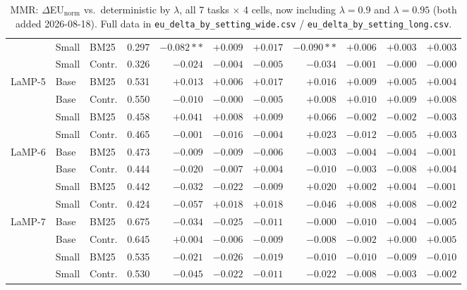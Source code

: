 \documentclass[10pt]{article}
\begin{document}
\begin{table}[p]
\begin{tabular}{@{}lllrrrrrrrr@{}}
\cmidrule(lr){2-11}
 & Small & BM25 & 0.297 & $-0.082**$ & $+0.009$ & $+0.017$ & $-0.090**$ & $+0.006$ & $+0.003$ & $+0.003$ \\
\cmidrule(lr){2-11}
 & Small & Contr. & 0.326 & $-0.024$ & $-0.004$ & $-0.005$ & $-0.034$ & $-0.001$ & $-0.000$ & $-0.000$ \\
\midrule
\multirow{4}{*}{LaMP-5} & Base & BM25 & 0.531 & $+0.013$ & $+0.006$ & $+0.017$ & $+0.016$ & $+0.009$ & $+0.005$ & $+0.004$ \\
\cmidrule(lr){2-11}
 & Base & Contr. & 0.550 & $-0.010$ & $-0.000$ & $-0.005$ & $+0.008$ & $+0.010$ & $+0.009$ & $+0.008$ \\
\cmidrule(lr){2-11}
 & Small & BM25 & 0.458 & $+0.041$ & $+0.008$ & $+0.009$ & $+0.066$ & $-0.002$ & $-0.002$ & $-0.003$ \\
\cmidrule(lr){2-11}
 & Small & Contr. & 0.465 & $-0.001$ & $-0.016$ & $-0.004$ & $+0.023$ & $-0.012$ & $-0.005$ & $+0.003$ \\
\midrule
\multirow{4}{*}{LaMP-6} & Base & BM25 & 0.473 & $-0.009$ & $-0.009$ & $-0.006$ & $-0.003$ & $-0.004$ & $-0.004$ & $-0.001$ \\
\cmidrule(lr){2-11}
 & Base & Contr. & 0.444 & $-0.020$ & $-0.007$ & $+0.004$ & $-0.010$ & $-0.003$ & $-0.008$ & $+0.004$ \\
\cmidrule(lr){2-11}
 & Small & BM25 & 0.442 & $-0.032$ & $-0.022$ & $-0.009$ & $+0.020$ & $+0.002$ & $+0.004$ & $-0.001$ \\
\cmidrule(lr){2-11}
 & Small & Contr. & 0.424 & $-0.057$ & $+0.018$ & $+0.018$ & $-0.046$ & $+0.008$ & $+0.008$ & $-0.002$ \\
\midrule
\multirow{4}{*}{LaMP-7} & Base & BM25 & 0.675 & $-0.034$ & $-0.025$ & $-0.011$ & $-0.000$ & $-0.010$ & $-0.004$ & $-0.005$ \\
\cmidrule(lr){2-11}
 & Base & Contr. & 0.645 & $+0.004$ & $-0.006$ & $-0.009$ & $-0.008$ & $-0.002$ & $+0.000$ & $+0.005$ \\
\cmidrule(lr){2-11}
 & Small & BM25 & 0.535 & $-0.021$ & $-0.026$ & $-0.019$ & $-0.010$ & $-0.010$ & $-0.009$ & $-0.010$ \\
\cmidrule(lr){2-11}
 & Small & Contr. & 0.530 & $-0.045$ & $-0.022$ & $-0.011$ & $-0.022$ & $-0.008$ & $-0.003$ & $-0.002$ \\
\bottomrule
\end{tabular}
\caption{MMR: $\Delta$EU$_{\text{norm}}$ vs.\ deterministic by $\lambda$, all 7
tasks $\times$ 4 cells, now including $\lambda{=}0.9$ and $\lambda{=}0.95$ (both
added 2026-08-18). Full data in \texttt{eu\_delta\_by\_setting\_wide.csv} /
\texttt{eu\_delta\_by\_setting\_long.csv}.}
\label{tab:delta-mmr}
\end{table}
\end{document}
